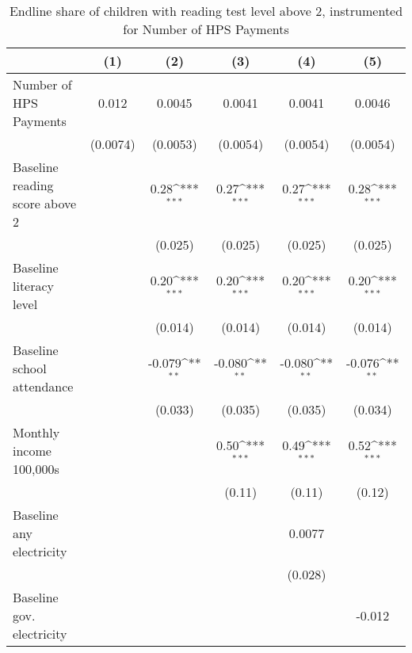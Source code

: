 \begin{table}[htbp]\centering
\def\sym#1{\ifmmode^{#1}\else\(^{#1}\)\fi}
\caption{Endline share of children with reading test level above 2, instrumented for Number of HPS Payments}
\begin{tabular*}{1\hsize}{@{\hskip\tabcolsep\extracolsep\fill}l*{5}{c}}
\toprule
                &\multicolumn{1}{c}{(1)}         &\multicolumn{1}{c}{(2)}         &\multicolumn{1}{c}{(3)}         &\multicolumn{1}{c}{(4)}         &\multicolumn{1}{c}{(5)}         \\
\midrule
Number of HPS Payments&    0.012         &   0.0045         &   0.0041         &   0.0041         &   0.0046         \\
                & (0.0074)         & (0.0053)         & (0.0054)         & (0.0054)         & (0.0054)         \\
Baseline reading score above 2&                  &     0.28\sym{***}&     0.27\sym{***}&     0.27\sym{***}&     0.28\sym{***}\\
                &                  &  (0.025)         &  (0.025)         &  (0.025)         &  (0.025)         \\
Baseline literacy level&                  &     0.20\sym{***}&     0.20\sym{***}&     0.20\sym{***}&     0.20\sym{***}\\
                &                  &  (0.014)         &  (0.014)         &  (0.014)         &  (0.014)         \\
Baseline school attendance&                  &   -0.079\sym{**} &   -0.080\sym{**} &   -0.080\sym{**} &   -0.076\sym{**} \\
                &                  &  (0.033)         &  (0.035)         &  (0.035)         &  (0.034)         \\
Monthly income 100,000s&                  &                  &     0.50\sym{***}&     0.49\sym{***}&     0.52\sym{***}\\
                &                  &                  &   (0.11)         &   (0.11)         &   (0.12)         \\
Baseline any electricity&                  &                  &                  &   0.0077         &                  \\
                &                  &                  &                  &  (0.028)         &                  \\
Baseline gov. electricity&                  &                  &                  &                  &   -0.012         \\

\end{tabular*}
\end{table}
